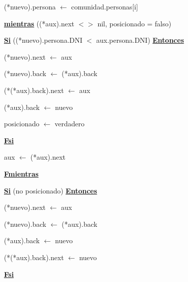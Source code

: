 \documentclass{article}
\begin{document}
                \hspace{20mm}(*nuevo).persona $\leftarrow$ comunidad.personas[i]

                \hspace{20mm}\underline{\textbf{mientras}} ((*aux).next $<>$ nil, posicionado = falso)

                    \hspace{24mm}\underline{\textbf{Si}} ((*nuevo).persona.DNI $<$ aux.persona.DNI) \underline{\textbf{Entonces}}

                        \hspace{28mm}(*nuevo).next $\leftarrow$ aux

                        \hspace{28mm}(*nuevo).back $\leftarrow$ (*aux).back

                        \hspace{28mm}(*(*aux).back).next $\leftarrow$ aux

                        \hspace{28mm}(*aux).back $\leftarrow$ nuevo

                        \hspace{28mm}posicionado $\leftarrow$ verdadero

                    \hspace{24mm}\underline{\textbf{Fsi}}

                    \hspace{24mm}aux $\leftarrow$ (*aux).next

                \hspace{20mm}\underline{\textbf{Fmientras}}

                \hspace{20mm}\underline{\textbf{Si}} (no posicionado) \underline{\textbf{Entonces}}

                    \hspace{24mm}(*nuevo).next $\leftarrow$ aux

                    \hspace{24mm}(*nuevo).back $\leftarrow$ (*aux).back

                    \hspace{24mm}(*aux).back $\leftarrow$ nuevo

                    \hspace{24mm}(*(*aux).back).next $\leftarrow$ nuevo

                \hspace{20mm}\underline{\textbf{Fsi}}
\end{document}
